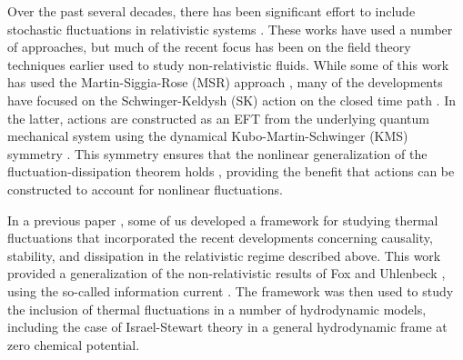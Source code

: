 \documentclass[aps,prd,nofootinbib,amsmath,amssymb,showpacs,longbibliography,singlecolumn,superscriptaddress,notitlepage]{revtex4-1}
\theoremstyle{plain}
\theoremstyle{definition}
\begin{document}
Over the past several decades, there has been significant effort to include stochastic fluctuations in relativistic systems \cite{Calzetta:1997aj, Kovtun:2003vj, Dunkel:2008ngc, Kapusta:2011gt, Kovtun:2011np, Kovtun:2012rj, Young:2013fka, Kumar:2013twa, Young:2014pka, Murase:2016rhl, Kapusta:2014dja, Akamatsu:2016llw, Akamatsu:2017rdu, Sakai:2017rfi, Stephanov:2017ghc, Martinez:2017jjf, Singh:2018dpk, Nahrgang:2018afz, Martinez:2018wia, Murase:2019cwc, An:2019osr, Martinez:2019bsn, Rajagopal:2019xwg, An:2020vri, An:2019csj, De:2020yyx, Sakai:2020pjw, Nahrgang:2020yxm, Dore:2020jye, Du:2020bxp, Calzetta:2020wzr, Torrieri:2020ezm, Dore:2021xqq, Petrosyan:2021lqi, De:2022tkb, Pradeep:2022mkf, An:2022jgc, Abbasi:2022rum, Chen:2022ryi, Kuroki:2023ebq}. These works have used a number of approaches, but much of the recent focus has been on the field theory techniques earlier used to study non-relativistic fluids. While some of this work has used the Martin-Siggia-Rose (MSR) approach \cite{Granese:2022igc, Abbasi:2022aao}, many of the developments have focused on the Schwinger-Keldysh (SK) action on the closed time path \cite{Grozdanov:2013dba, Kovtun:2014hpa, Harder:2015nxa, Crossley:2015evo, Sieberer:2015hba, Haehl:2015pja, Haehl:2015uoc, Haehl:2016pec, Jensen:2017kzi, Glorioso:2017fpd, Liu:2018kfw, Chen-Lin:2018kfl, Jensen:2018hse, deBoer:2018qqm, Haehl:2018lcu, Ghosh:2020lel, Jain:2020vgc, Jain:2020zhu, Pantelidou:2022ftm, Baggioli:2023tlc, Akyuz:2023lsm}. In the latter, actions are constructed as an EFT from the underlying quantum mechanical system using the dynamical Kubo-Martin-Schwinger (KMS) symmetry \cite{Crossley:2015evo, Kubo:1957mj, Martin:1959jp}. This symmetry ensures that the nonlinear generalization of the fluctuation-dissipation theorem holds \cite{Wang:1998wg}, providing the benefit that actions can be constructed to account for nonlinear fluctuations. 


In a previous paper \cite{Mullins:2023tjg}, some of us developed a framework for studying thermal fluctuations that incorporated the recent developments concerning causality, stability, and dissipation in the relativistic regime described above. This work provided a generalization of the non-relativistic results of Fox and Uhlenbeck \cite{doi:10.1063/1.1693183}, using the so-called information current \cite{Gavassino:2021kjm}. The framework was then used to study the inclusion of thermal fluctuations in a number of hydrodynamic models, including the case of Israel-Stewart theory in a general hydrodynamic frame \cite{Noronha:2021syv} at zero chemical potential. 
\end{document}
